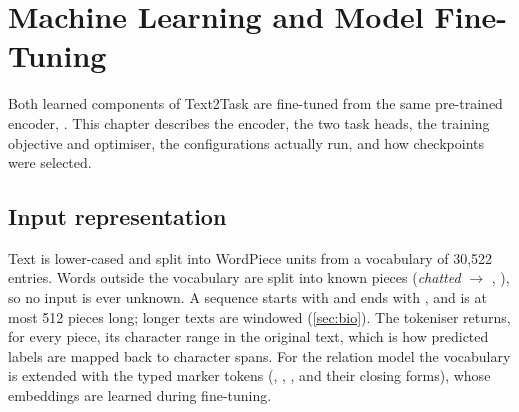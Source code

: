 \chapter{Machine Learning and Model Fine-Tuning}
\label{ch:models}

Both learned components of Text2Task are fine-tuned from the same pre-trained encoder,  \citep{sanh2019distilbert}. This chapter describes the encoder, the two task heads, the training objective and optimiser, the configurations actually run, and how checkpoints were selected.

\section{Input representation}
Text is lower-cased and split into WordPiece units from a vocabulary of 30,522 entries. Words outside the vocabulary are split into known pieces (\emph{chatted} $\to$ , ), so no input is ever unknown. A sequence starts with \code{[CLS]} and ends with \code{[SEP]}, and is at most 512 pieces long; longer texts are windowed (\cref{sec:bio}). The tokeniser returns, for every piece, its character range in the original text, which is how predicted labels are mapped back to character spans. For the relation model the vocabulary is extended with the typed marker tokens (\code{[E1\_TASK]}, \code{[/E1\_TASK]}, \code{[E2\_PERSON]}, \code{[E2\_TEMPORAL]} and their closing forms), whose embeddings are learned during fine-tuning.

